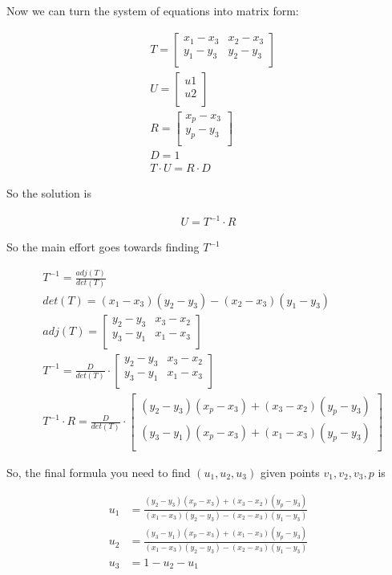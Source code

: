\documentclass{article}
\begin{document}
Now we can turn the system of equations into matrix form:

\begin{align}
  & T =
  \begin{bmatrix}
    x_1 - x_3 & x_2 - x_3 \\
    y_1 - y_3 & y_2 - y_3 \\
  \end{bmatrix} \\
  & U = \begin{bmatrix}
    u1 \\ u2 \\
  \end{bmatrix}\\
  & R = \begin{bmatrix}
    x_p - x_3 \\
    y_p - y_3 \\
  \end{bmatrix} \\
  & D = 1 \\
  & T \cdot U = R \cdot D
\end{align}

So the solution is

\begin{align}
  U = T^{-1} \cdot R
\end{align}

So the main effort goes towards finding $T^{-1}$

\begin{align}
  & T^{-1} = \frac{adj(T)}{det(T)} \\
  & det(T) = (x_1 - x_3)(y_2 - y_3) - (x_2 - x_3)(y_1 - y_3) \\
  & adj(T) = \begin{bmatrix}
    y_2 - y_3 & x_3 - x_2 \\
    y_3 - y_1 & x_1 - x_3 \\
  \end{bmatrix} \\
  & T^{-1} = \frac{D}{det(T)} \cdot \begin{bmatrix}
    y_2 - y_3 & x_3 - x_2 \\
    y_3 - y_1 & x_1 - x_3 \\
  \end{bmatrix} \\
  & T^{-1}\cdot R = \frac{D}{det(T)} \cdot \begin{bmatrix}
    (y_2 - y_3)(x_p - x_3) + (x_3 - x_2)(y_p - y_3) \\
    (y_3 - y_1)(x_p - x_3) + (x_1 - x_3)(y_p - y_3) \\
  \end{bmatrix}
\end{align}

So, the final formula you need to find $(u_1, u_2, u_3)$ given points $v_1, v_2, v_3, p$ is

\begin{align}
  u_1 &= \frac{(y_2 - y_3)(x_p - x_3) + (x_3 - x_2)(y_p - y_3)}{(x_1 - x_3)(y_2 - y_3) - (x_2 - x_3)(y_1 - y_3)} \\
  u_2 &= \frac{(y_3 - y_1)(x_p - x_3) + (x_1 - x_3)(y_p - y_3)}{(x_1 - x_3)(y_2 - y_3) - (x_2 - x_3)(y_1 - y_3)} \\
  u_3 &= 1 - u_2 - u_1
\end{align}
\end{document}
